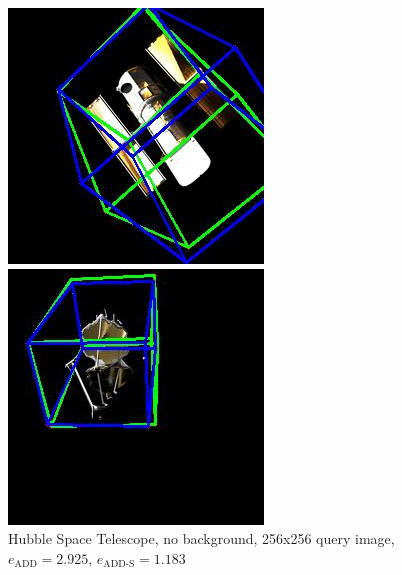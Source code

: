 \begin{figure}[h]
    \centering
    \begin{minipage}{0.45\linewidth}
        \centering
        \includegraphics[width=\linewidth]{data/fig3.jpg} %
        \caption{Hubble Space Telescope, no background, 256x256 query image, $e_\mathrm{ADD}=2.925$, $e_{\mathrm{ADD}\text{-}\mathrm{S}}=1.183$ }
        \label{fig:fig3}
    \end{minipage}\hfill
    \begin{minipage}{0.45\linewidth}
        \centering
        \includegraphics[width=\linewidth]{data/fig4.jpg} %

\end{minipage}
\end{figure}
